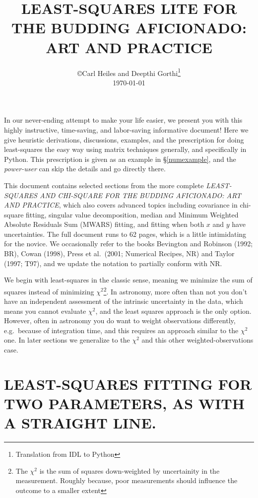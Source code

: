 \documentclass[psfig,preprint]{aastex}
\begin{document}
\setcounter{section}{-1}

\title{LEAST-SQUARES LITE FOR THE BUDDING AFICIONADO: \\ 
ART AND PRACTICE } 

\author{\copyright Carl Heiles and Deepthi Gorthi\footnote{Translation from IDL to Python}\\ \today }

	In our never-ending attempt to make your life easier, we present
you with this highly instructive, time-saving, and labor-saving
informative document! Here we give heuristic derivations, discussions,
examples, and the prescription for doing least-squares the easy way
using matrix techniques generally, and specifically in Python.  This
prescription is given as an example in \S\ref{numexample}, and the {\it
power-user} can skip the details and go directly there.  

	This document contains selected sections from the more complete
{\it LEAST-SQUARES AND CHI-SQUARE FOR THE BUDDING AFICIONADO: ART AND
PRACTICE}, which also covers advanced topics including covariance in
chi-square fitting, singular value decomposition, median and Minimum
Weighted Absolute Residuals Sum (MWARS) fitting, and fitting when both
$x$ and $y$ have uncertainties.  The full document runs to 62 pages,
which is a little intimidating for the novice.  We occasionally refer to
the books Bevington and Robinson (1992; BR), Cowan (1998), Press et al.\
(2001; Numerical Recipes, NR) and Taylor (1997; T97), and we update the
notation to partially conform with NR. 

	We begin with least-squares in the classic sense, meaning we
minimize the sum of squares instead of minimizing $\chi^2$\footnote{The $\chi^2$
is the sum of squares down-weighted by uncertainity in the measurement. Roughly 
because, poor measurements should influence the outcome to a smaller extent}. In
astronomy,  more often than not you don't have an independent assessment
of the intrinsic uncertainty in the data, which means you cannot
evaluate $\chi^2$, and the least squares  approach is the only option.
However, often in astronomy you do want to weight observations
differently, e.g.\ because of integration time, and this requires an
approach similar to the $\chi^2$ one. In later sections we generalize to
the $\chi^2$ and this other weighted-observations case.

\tableofcontents

\section{LEAST-SQUARES FITTING FOR TWO PARAMETERS, AS WITH A STRAIGHT
LINE.} \label{sectionone}
\end{document}
